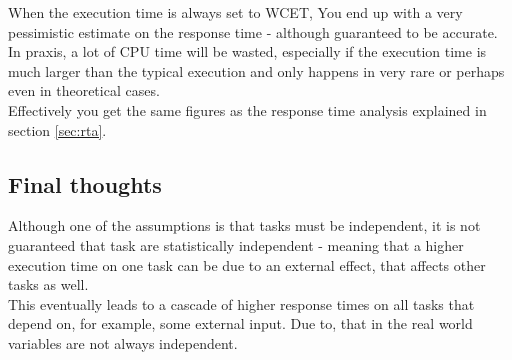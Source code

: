 When the execution time is always set to WCET, You end up with a very pessimistic estimate on the response time - although guaranteed to be accurate. In praxis, a lot of CPU time will be wasted, especially if the execution time is much larger than the typical execution and only happens in very rare or perhaps even in theoretical cases.\\
Effectively you get the same figures as the response time analysis explained in section \ref{sec:rta}.
\subsection{Final thoughts}
Although one of the assumptions is that tasks must be independent, it is not guaranteed that task are statistically independent - meaning that a higher execution time on one task can be due to an external effect, that affects other tasks as well.\\
This eventually leads to a cascade of higher response times on all tasks that depend on, for example, some external input. Due to, that in the real world variables are not always independent.